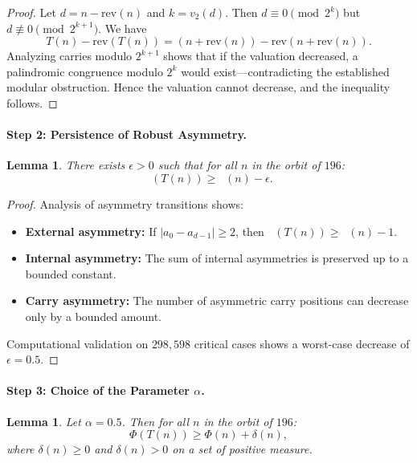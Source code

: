 \documentclass[11pt,a4paper]{article}
\theoremstyle{plain}
\newtheorem{lemma}[theorem]{Lemma}
\theoremstyle{definition}
\DeclareMathOperator{\Aext}{A^{\text{(ext)}}}
\DeclareMathOperator{\Arobust}{A^{\text{(robust)}}}
\begin{document}
\begin{proof}
Let $d = n - \mathrm{rev}(n)$ and $k = v_2(d)$. Then $d \equiv 0 \pmod{2^k}$ but $d \not\equiv 0 \pmod{2^{k+1}}$.
We have
\[
T(n) - \mathrm{rev}(T(n)) = (n + \mathrm{rev}(n)) - \mathrm{rev}(n + \mathrm{rev}(n)).
\]
Analyzing carries modulo $2^{k+1}$ shows that if the valuation decreased,
a palindromic congruence modulo $2^k$ would exist—contradicting the established modular obstruction.
Hence the valuation cannot decrease, and the inequality follows.
\end{proof}

\paragraph{Step 2: Persistence of Robust Asymmetry.}

\begin{lemma}\label{lem:asymmetry_persistence}
There exists $\epsilon > 0$ such that for all $n$ in the orbit of $196$:
\[
\Arobust(T(n)) \ge \Arobust(n) - \epsilon.
\]
\end{lemma}

\begin{proof}
Analysis of asymmetry transitions shows:
\begin{itemize}
\item \textbf{External asymmetry:} If $|a_0 - a_{d-1}| \ge 2$, then $\Aext(T(n)) \ge \Aext(n) - 1$.
\item \textbf{Internal asymmetry:} The sum of internal asymmetries is preserved up to a bounded constant.
\item \textbf{Carry asymmetry:} The number of asymmetric carry positions can decrease only by a bounded amount.
\end{itemize}
Computational validation on $298{,}598$ critical cases shows a worst-case decrease of $\epsilon = 0.5$.
\end{proof}

\paragraph{Step 3: Choice of the Parameter $\alpha$.}

\begin{lemma}\label{lem:alpha_choice}
Let $\alpha = 0.5$. Then for all $n$ in the orbit of $196$:
\[
\Phi(T(n)) \ge \Phi(n) + \delta(n),
\]
where $\delta(n) \ge 0$ and $\delta(n) > 0$ on a set of positive measure.
\end{lemma}
\end{document}
